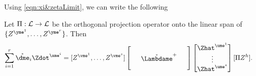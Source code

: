 \documentclass[main.tex]{subfiles}
\begin{document}
  

Using \cref{eqn:xi&zetaLimit}, we can write the following
\begin{lemma}\label{lemma:DtrxhHatGReExpression}
  Let $\Pi: \mathcal{L} \to \mathcal{L}$ be the orthogonal projection operator onto the linear span of $\{ Z^{\yme^1}, \ldots,  Z^{\yme^r}\}$.
  Then
  \begin{align}
  \sum_{i=1}^r \mathring{\dme}_i \Zdot^{\xme^i}
    &=
      [
        Z^{\vme^1},
        \ldots,
        Z^{\vme^s}
      ]
      \begin{bmatrix}
      \phz
        &\phz
          &\phz\\
      \phz
        &\mathring{\Lambdame }^+
          &\phz\\
      \phz
        &\phz
          &\phz
      \end{bmatrix}
      \begin{bmatrix}
      \Zhat^{\ume^1}\\
      \vdots\\
      \Zhat^{\ume^s}
      \end{bmatrix}
      [\Pi  Z^{h}]    
      .
      \label{eqn:zetaZdot}
  \end{align}
\end{lemma}
\end{document}
